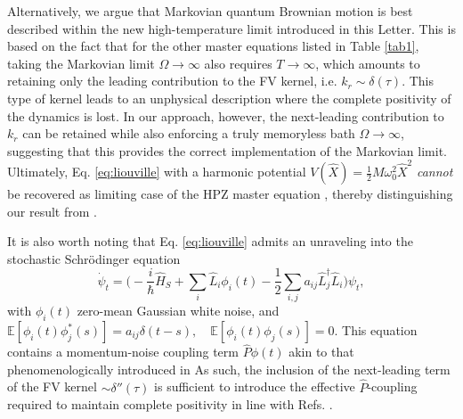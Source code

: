 \documentclass[prl,twocolumn,superscriptaddress,amsmath,amssymb]{revtex4-2}
\begin{document}
Alternatively, we argue that Markovian quantum Brownian motion is best described within the new high-temperature limit introduced in this Letter. This is based on the fact that for the other master equations listed in Table \ref{tab1}, taking the Markovian limit $\Omega\rightarrow\infty$ also requires $T\rightarrow\infty$, which amounts to retaining only the leading contribution to the FV kernel, i.e. $k_r\sim\delta(\tau)$. This type of kernel leads to an unphysical description where the complete positivity of the dynamics is lost. In our approach, however, the next-leading contribution to $k_r$ can be retained while also enforcing a truly memoryless bath $\Omega\rightarrow\infty$, suggesting that this provides the correct implementation of the Markovian limit. Ultimately, Eq. \eqref{eq:liouville} with a harmonic potential $V(\hat{X}) = \frac{1}{2}M\omega^2_0\hat{X}^2$ {\it cannot} be recovered as limiting case of the HPZ master equation \cite{BP2002}, thereby distinguishing our result from \cite{Hu1992,StrunzYu2004,Yu2004}.

It is also worth noting that Eq. \eqref{eq:liouville} admits an unraveling into the stochastic Schr\"{o}dinger equation \cite{StrunzYu2004}
\begin{equation}
    \dot{\psi}_t = \Big(-\frac{i}{\hbar}\hat{H}_S +\sum_i\hat{L}_i\phi_i(t) - \frac{1}{2}\sum_{i,j}a_{ij}\hat{L}^{\dagger}_j\hat{L}_i\Big)\psi_t,
\end{equation}
with $\phi_i(t)$ zero-mean Gaussian white noise, and $\mathbb{E}[\phi_i(t)\phi^*_j(s)]=a_{ij}\delta(t-s), \quad \mathbb{E}[\phi_i(t)\phi_j(s)] = 0$. This equation contains a momentum-noise coupling term $\hat{P}\phi(t)$ akin to that phenomenologically introduced in \cite{Ferialdi2016} As such, the inclusion of the next-leading term of the FV kernel $\sim\delta''(\tau)$ is sufficient to introduce the effective $\hat{P}$-coupling required to maintain complete positivity in line with Refs. \cite{Halliwell1995, Gao1997,Ford1999,Vacchini2000,Petruccione2005,Diosi1995}.
\end{document}
